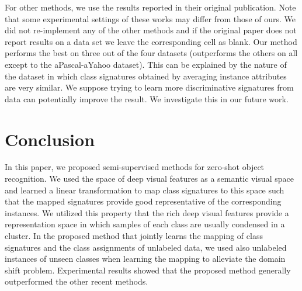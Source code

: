 \documentclass[10pt,twocolumn,letterpaper]{article}
\begin{document}
 For other methods, we use the results reported in their original publication. Note that some experimental settings of these works may differ from those of ours. We did not re-implement any of the other methods and if the original paper does not report results on a data set we leave the corresponding cell as blank.
Our method performs the best on three out of the four datasets (outperforms the others on all except to the aPascal-aYahoo dataset). This can be explained by the nature of the dataset in which class signatures obtained by averaging instance attributes are very similar. We suppose trying to learn
more discriminative signatures from data can potentially improve the result. We investigate this in our future work.


\section{Conclusion} \label{conclusion}
In this paper, we proposed semi-supervised methods for zero-shot object recognition. We used the space of deep visual features as a semantic visual space and learned a linear transformation to map class signatures to this space such that the mapped signatures provide good representative of the corresponding instances. We utilized this property that the rich deep visual features provide a representation space in which samples of each class are usually condensed in a cluster. In the proposed method that jointly learns the mapping of class signatures and the class assignments of unlabeled data, we used also unlabeled instances of unseen classes when learning the mapping to alleviate the domain shift problem. Experimental results showed that the proposed method generally outperformed the other recent methods.
{\small


}
\end{document}
